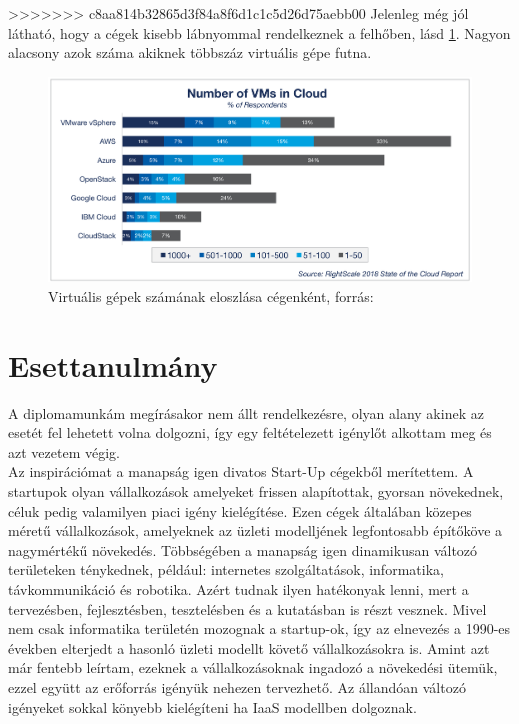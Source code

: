 \documentclass[12pt,oneside,justify,table]{book}
\begin{document}
>>>>>>> c8aa814b32865d3f84a8f6d1c1c5d26d75aebb00
Jelenleg még jól látható, hogy a cégek kisebb lábnyommal rendelkeznek a felhőben, lásd \ref{fig:VMsPerCompany}. Nagyon alacsony azok száma akiknek többszáz virtuális gépe futna. 
\begin{figure}[H]
\centering
\includegraphics[width=1\textwidth]{26-Cloud-Computing-Trends-Number-of-VMs.png}
\caption{Virtuális gépek számának eloszlása cégenként, forrás: \cite{RightScale}}
\label{fig:VMsPerCompany}
\end{figure}

\chapter{Esettanulmány}

A diplomamunkám megírásakor nem állt rendelkezésre, olyan alany akinek az esetét fel lehetett volna dolgozni, így egy feltételezett igénylőt alkottam meg és azt vezetem végig. \\

Az inspirációmat a manapság igen divatos Start-Up cégekből merítettem. A startupok olyan vállalkozások amelyeket frissen alapítottak, gyorsan növekednek, céluk pedig valamilyen piaci igény kielégítése. Ezen cégek általában közepes méretű vállalkozások, amelyeknek az üzleti modelljének legfontosabb építőköve a nagymértékű növekedés. Többségében a manapság igen dinamikusan változó területeken ténykednek, például: internetes szolgáltatások, informatika, távkommunikáció és robotika. Azért tudnak ilyen hatékonyak lenni, mert a tervezésben, fejlesztésben, tesztelésben és a kutatásban is részt vesznek. Mivel nem csak informatika területén mozognak a startup-ok, így az elnevezés a 1990-es években elterjedt a hasonló üzleti modellt követő vállalkozásokra is.
Amint azt már fentebb leírtam, ezeknek a vállalkozásoknak ingadozó a növekedési ütemük, ezzel együtt az erőforrás igényük nehezen tervezhető.  Az állandóan változó igényeket sokkal könyebb kielégíteni ha IaaS modellben dolgoznak.\\
\end{document}
